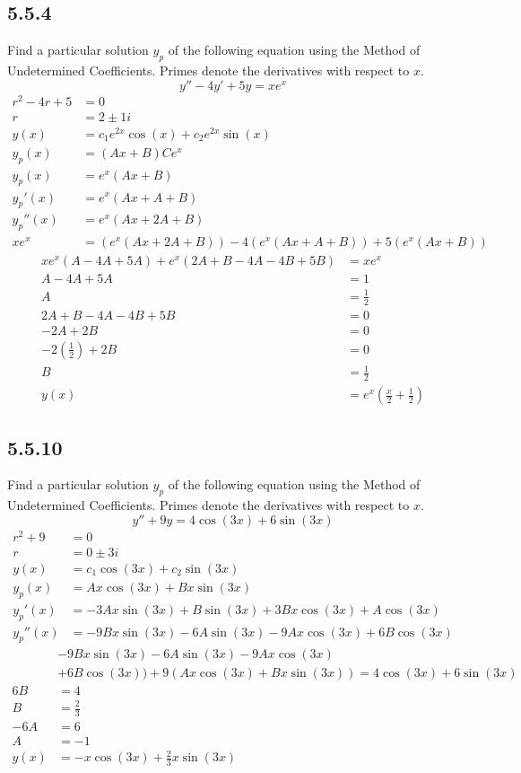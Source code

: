 \documentclass{article}
\begin{document}
\subsection{5.5.4}
Find a particular solution $ y_p $ of the following equation using the Method of Undetermined Coefficients. Primes denote the derivatives with respect to $ x $.
$$ y'' - 4y' + 5y = xe^x $$
\begin{align*}
	r^2 - 4r + 5 & = 0 \\
	r & = 2 \pm 1i \\
	y(x) & = c_1e^{2x}\cos(x) + c_2e^{2x}\sin(x) \\
	y_p(x) & = (Ax + B)Ce^x \\
	y_p(x) & = e^x(Ax + B) \\
	y_p'(x) & = e^x(Ax + A + B) \\
	y_p''(x) & = e^x(Ax + 2A + B) \\
	xe^x & = (e^x(Ax + 2A + B)) - 4(e^x(Ax + A + B)) + 5(e^x(Ax + B))
\end{align*}
\begin{align*}
	xe^x(A - 4A + 5A) + e^x(2A + B - 4A - 4B + 5B) & = xe^x \\
	A - 4A + 5A & = 1 \\
	A & = \frac{1}{2} \\
	2A + B - 4A - 4B + 5B & = 0 \\
	-2A + 2B & = 0 \\
	-2 \left( \frac{1}{2} \right) + 2B & = 0 \\
	B & = \frac{1}{2} \\
	y(x) & = e^x \left( \frac{x}{2} + \frac{1}{2} \right)
\end{align*}

\subsection{5.5.10}
Find a particular solution $ y_p $ of the following equation using the Method of Undetermined Coefficients. Primes denote the derivatives with respect to $ x $.
$$ y'' + 9y = 4\cos(3x) + 6\sin(3x) $$
\begin{align*}
	r^2 + 9 & = 0 \\
	r & = 0 \pm 3i \\
	y(x) & = c_1\cos(3x) + c_2\sin(3x) \\
	y_p(x) & = Ax\cos(3x) + Bx\sin(3x) \\
	y_p'(x) & = -3Ax\sin(3x) + B\sin(3x) + 3Bx\cos(3x) + A\cos(3x) \\
	y_p''(x) & = -9Bx\sin(3x) - 6A\sin(3x) - 9Ax\cos(3x) + 6B\cos(3x)
\end{align*}
\begin{align*}
	& -9Bx\sin(3x) - 6A\sin(3x) - 9Ax\cos(3x) \\
	& + 6B\cos(3x)) + 9(Ax\cos(3x) + Bx\sin(3x)) = 4\cos(3x) + 6\sin(3x) \\
	6B & = 4 \\
	B & = \frac{2}{3} \\
	-6A & = 6 \\
	A & = -1 \\
	y(x) & = -x\cos(3x) + \frac{2}{3}x\sin(3x)
\end{align*}
\end{document}
